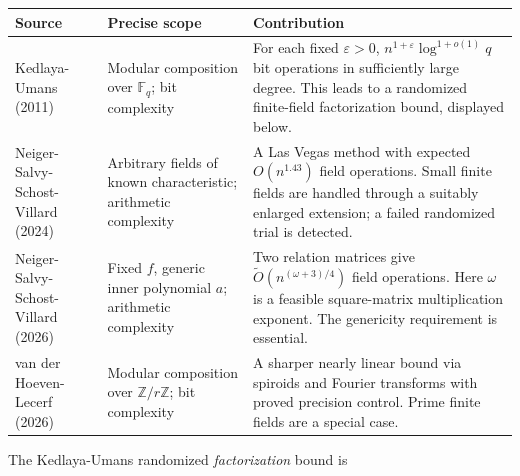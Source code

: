 \documentclass[11pt,a4paper,oneside,openany]{book}
\begin{document}
\begin{center}\small\begin{tabularx}{\linewidth}{@{}>{\raggedright\arraybackslash}X>{\raggedright\arraybackslash}X>{\raggedright\arraybackslash}X@{}}\toprule
\textbf{Source} & \textbf{Precise scope} & \textbf{Contribution} \\
\midrule
Kedlaya-Umans (2011) & Modular composition over \(\mathbb F_q\); bit complexity & For each fixed \(\varepsilon>0\), \(n^{1+\varepsilon}\log^{1+o(1)}q\) bit operations in sufficiently large degree. This leads to a randomized finite-field factorization bound, displayed below. \\
Neiger-Salvy-Schost-Villard (2024) & Arbitrary fields of known characteristic; arithmetic complexity & A Las Vegas method with expected \(O(n^{1.43})\) field operations. Small finite fields are handled through a suitably enlarged extension; a failed randomized trial is detected. \\
Neiger-Salvy-Schost-Villard (2026) & Fixed \(f\), generic inner polynomial \(a\); arithmetic complexity & Two relation matrices give \(\widetilde O(n^{(\omega+3)/4})\) field operations. Here \(\omega\) is a feasible square-matrix multiplication exponent. The genericity requirement is essential. \\
van der Hoeven-Lecerf (2026) & Modular composition over \(\mathbb Z/r\mathbb Z\); bit complexity & A sharper nearly linear bound via spiroids and Fourier transforms with proved precision control. Prime finite fields are a special case. \\
\bottomrule\end{tabularx}\end{center}
\color{black} The Kedlaya-Umans randomized \emph{factorization} bound is\par
\end{document}
